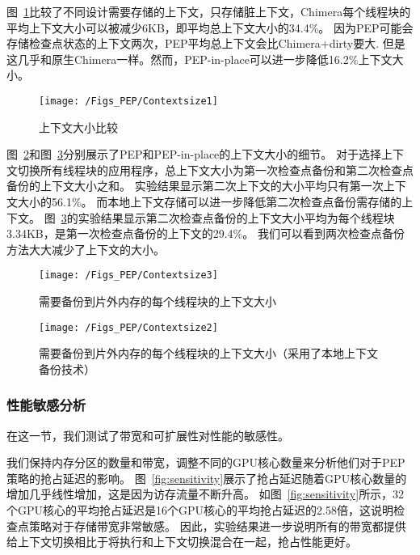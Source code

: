 图~\ref{fig:Contextsize1}比较了不同设计需要存储的上下文，只存储脏上下文，Chimera每个线程块的平均上下文大小可以被减少6KB，即平均总上下文大小的34.4\%。
因为PEP可能会存储检查点状态的上下文两次，PEP平均总上下文会比Chimera+dirty要大.
但是这几乎和原生Chimera一样。然而，PEP-in-place可以进一步降低16.2\%上下文大小。

\begin{figure}[htbp] %
  \centering
  \texttt{[image: /Figs\_PEP/Contextsize1]}
  \caption{上下文大小比较}
  \label{fig:Contextsize1}
\end{figure}



图~\ref{fig:Contextsize3}和图~\ref{fig:Contextsize2}分别展示了PEP和PEP-in-place的上下文大小的细节。
对于选择上下文切换所有线程块的应用程序，总上下文大小为第一次检查点备份和第二次检查点备份的上下文大小之和。
实验结果显示第二次上下文的大小平均只有第一次上下文大小的56.1\%。
而本地上下文存储可以进一步降低第二次检查点备份需存储的上下文。
图~\ref{fig:Contextsize2}的实验结果显示第二次检查点备份的上下文大小平均为每个线程块3.34KB，是第一次检查点备份的上下文的29.4\%。
我们可以看到两次检查点备份方法大大减少了上下文的大小。

\begin{figure}[htbp] %
  \centering
  \texttt{[image: /Figs\_PEP/Contextsize3]}
  \caption{需要备份到片外内存的每个线程块的上下文大小}
  \label{fig:Contextsize3}
\end{figure}

\begin{figure}[htbp] %
  \centering
  \texttt{[image: /Figs\_PEP/Contextsize2]}
  \caption{需要备份到片外内存的每个线程块的上下文大小（采用了本地上下文备份技术）}
  \label{fig:Contextsize2}
\end{figure}



\subsubsection{性能敏感分析}

在这一节，我们测试了带宽和可扩展性对性能的敏感性。

我们保持内存分区的数量和带宽，调整不同的GPU核心数量来分析他们对于PEP策略的抢占延迟的影响。
图~\ref{fig:sensitivity}展示了抢占延迟随着GPU核心数量的增加几乎线性增加，这是因为访存流量不断升高。
如图~\ref{fig:sensitivity}所示，32个GPU核心的平均抢占延迟是16个GPU核心的平均抢占延迟的2.58倍，这说明检查点策略对于存储带宽非常敏感。
因此，实验结果进一步说明所有的带宽都提供给上下文切换相比于将执行和上下文切换混合在一起，抢占性能更好。

